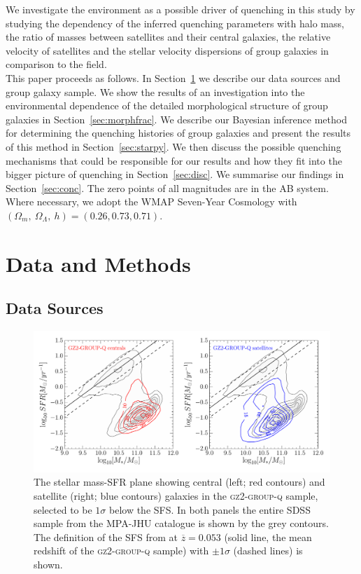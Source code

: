 \documentclass[useAMS,usenatbib]{mn2e}
\begin{document}
We investigate the environment as a possible driver of quenching in this study by studying the dependency of the inferred quenching parameters with halo mass, the ratio of masses between satellites and their central galaxies, the relative velocity of satellites and the stellar velocity dispersions of group galaxies in comparison to the field. 
\\

This paper proceeds as follows. In Section~\ref{sec:data} we describe our data sources and group galaxy sample. We show the results of an investigation into the environmental dependence of the detailed morphological structure of group galaxies in Section~\ref{sec:morphfrac}. We describe our Bayesian inference method for determining the quenching histories of group galaxies and present the results of this method in Section~\ref{sec:starpy}. We then discuss the possible quenching mechanisms that could be responsible for our results and how they fit into the bigger picture of quenching in Section~\ref{sec:disc}. We summarise our findings in Section~\ref{sec:conc}. The zero points of all magnitudes are in the AB system. Where necessary, we adopt the WMAP Seven-Year Cosmology \citep{jarosik11} with $(\Omega_m , ~\Omega_\Lambda , ~h) = (0.26, 0.73, 0.71)$.

 
\section{Data and Methods}\label{sec:data}

\subsection{Data Sources}\label{sec:photo}

\begin{figure}
\centering
\includegraphics[width=\textwidth]{sfr_mass_quenched_centrals_satellites_gz2_group.pdf}
\caption[Stellar mass-SFR plane for the centrals and satellites of the \textsc{gz2-group-q} sample]{The stellar mass-SFR plane showing central (left; red contours) and satellite (right; blue contours) galaxies in the \textsc{gz2-group-q} sample, selected to be $1\sigma$ below the SFS. In both panels the entire SDSS sample from the MPA-JHU catalogue is shown by the grey contours. The definition of the SFS from \cite{peng10} at $\overline{z} = 0.053$ (solid line, the mean redshift of the \textsc{gz2-group-q} sample) with $\pm1\sigma$ (dashed lines) is shown.}
\label{fig:sfrmass}
\end{figure}
\end{document}
